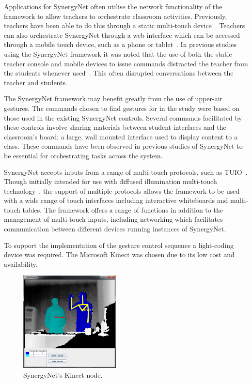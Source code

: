 \documentclass[link]{IWCOMP}
\begin{document}
Applications for SynergyNet often utilise the network functionality of the framework to allow teachers to orchestrate classroom activities.
Previously, teachers have been able to do this through a static multi-touch device~\cite{AlAgha2010}.
Teachers can also orchestrate SynergyNet through a web interface which can be accessed through a mobile touch device, such as a phone or tablet~\cite{Mercier2013}.
In previous studies using the SynergyNet framework it was noted that the use of both the static teacher console and mobile devices to issue commands distracted the teacher from the students whenever used~\cite{Hatch2011,Mercier2013}.
This often disrupted conversations between the teacher and students.  

The SynergyNet framework may benefit greatly from the use of upper-air gestures. 
The commands chosen to find gestures for in the study were based on those used in the existing SynergyNet controls. 
Several commands facilitated by these controls involve sharing materials between student interfaces and the classroom's board; a large, wall mounted interface used to display content to a class.
These commands have been observed in previous studies of SynergyNet to be essential for orchestrating tasks across the system.

SynergyNet accepts inputs from a range of multi-touch protocols, such as TUIO~\cite{Kaltenbrunner2009}.
Though initially intended for use with diffused illumination multi-touch technology~\cite{Matsushita1997}, the support of multiple protocols allows the framework to be used with a wide range of touch interfaces including interactive whiteboards and multi-touch tables.
The framework offers a range of functions in addition to the management of multi-touch inputs, including networking which facilitates communication between different devices running instances of SynergyNet.

To support the implementation of the gesture control sequence a light-coding device was required.
The Microsoft Kinect was chosen due to its low cost and availability.

\begin{figure}[h]
   \centering
   \includegraphics[width=0.45\textwidth]{figures/kinect_node.png}
   \caption{SynergyNet's Kinect node.}
   \label{fig:kinectNode}
\end{figure}
\end{document}
